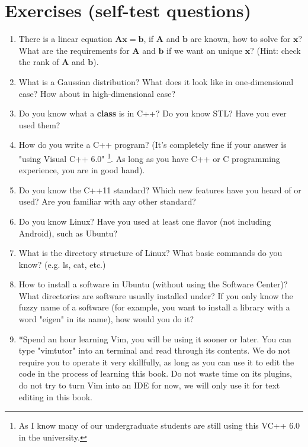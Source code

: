 \section{Exercises (self-test questions)}
\begin{enumerate}
	\item There is a linear equation $\mathbf{Ax}=\mathbf{b}$, if $\mathbf{A}$ and $\mathbf{b}$ are known, how to solve for $\mathbf{x}$? What are the requirements for $\mathbf{A}$ and $\mathbf{b}$ if we want an unique $\mathbf{x}$? (Hint: check the rank of $\mathbf{A}$ and $\mathbf{b}$).
	
	\item What is a Gaussian distribution? What does it look like in one-dimensional case? How about in high-dimensional case?
	
	\item Do you know what a \textbf{class} is in C++? Do you know STL? Have you ever used them?
	
	\item How do you write a C++ program? (It's completely fine if your answer is "using Visual C++ 6.0" \footnote{As I know many of our undergraduate students are still using this VC++ 6.0 in the university. }. As long as you have C++ or C programming experience, you are in good hand).
	
	\item Do you know the C++11 standard? Which new features have you heard of or used? Are you familiar with any other standard?
	
	\item Do you know Linux? Have you used at least one flavor (not including Android), such as Ubuntu?
	
	\item What is the directory structure of Linux? What basic commands do you know? (e.g. ls, cat, etc.)
	
	\item How to install a software in Ubuntu (without using the Software Center)? What directories are software usually installed under? If you only know the fuzzy name of a software (for example, you want to install a library with a word "eigen" in its name), how would you do it?
	
	\item *Spend an hour learning Vim, you will be using it sooner or later. You can type "vimtutor" into an terminal and read through its contents. We do not require you to operate it very skillfully, as long as you can use it to edit the code in the process of learning this book. Do not waste time on its plugins, do not try to turn Vim into an IDE for now, we will only use it for text editing in this book.
	
\end{enumerate}